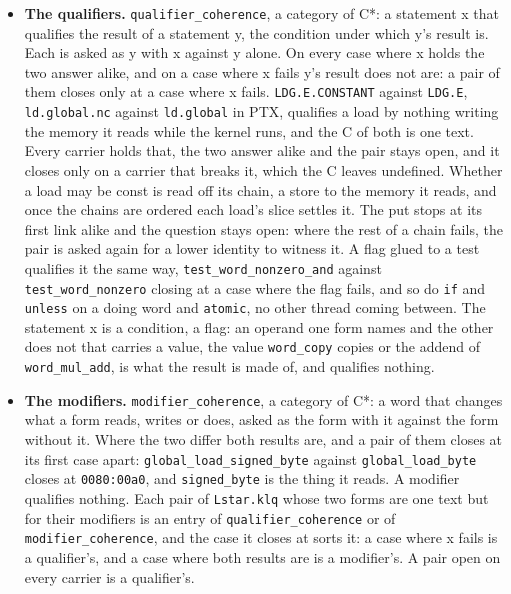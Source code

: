 \begin{itemize}
\item \textbf{The qualifiers.} \texttt{qualifier\_\allowbreak{}coherence}, a category of C*: a statement x that qualifies the result of a statement y, the condition under which y's result is. Each is asked as y with x against y alone. On every case where x holds the two answer alike, and on a case where x fails y's result does not are: a pair of them closes only at a case where x fails. \texttt{LDG.\allowbreak{}E.\allowbreak{}CONSTANT} against \texttt{LDG.\allowbreak{}E}, \texttt{ld.\allowbreak{}global.\allowbreak{}nc} against \texttt{ld.\allowbreak{}global} in PTX, qualifies a load by nothing writing the memory it reads while the kernel runs, and the C of both is one text. Every carrier holds that, the two answer alike and the pair stays open, and it closes only on a carrier that breaks it, which the C leaves undefined. Whether a load may be const is read off its chain, a store to the memory it reads, and once the chains are ordered each load's slice settles it. The put stops at its first link alike and the question stays open: where the rest of a chain fails, the pair is asked again for a lower identity to witness it. A flag glued to a test qualifies it the same way, \texttt{test\_\allowbreak{}word\_\allowbreak{}nonzero\_\allowbreak{}and} against \texttt{test\_\allowbreak{}word\_\allowbreak{}nonzero} closing at a case where the flag fails, and so do \texttt{if} and \texttt{unless} on a doing word and \texttt{atomic}, no other thread coming between. The statement x is a condition, a flag: an operand one form names and the other does not that carries a value, the value \texttt{word\_\allowbreak{}copy} copies or the addend of \texttt{word\_\allowbreak{}mul\_\allowbreak{}add}, is what the result is made of, and qualifies nothing.
\item \textbf{The modifiers.} \texttt{modifier\_\allowbreak{}coherence}, a category of C*: a word that changes what a form reads, writes or does, asked as the form with it against the form without it. Where the two differ both results are, and a pair of them closes at its first case apart: \texttt{global\_\allowbreak{}load\_\allowbreak{}signed\_\allowbreak{}byte} against \texttt{global\_\allowbreak{}load\_\allowbreak{}byte} closes at \texttt{0080:00a0}, and \texttt{signed\_\allowbreak{}byte} is the thing it reads. A modifier qualifies nothing. Each pair of \texttt{Lstar.\allowbreak{}klq} whose two forms are one text but for their modifiers is an entry of \texttt{qualifier\_\allowbreak{}coherence} or of \texttt{modifier\_\allowbreak{}coherence}, and the case it closes at sorts it: a case where x fails is a qualifier's, and a case where both results are is a modifier's. A pair open on every carrier is a qualifier's.

\end{itemize}
